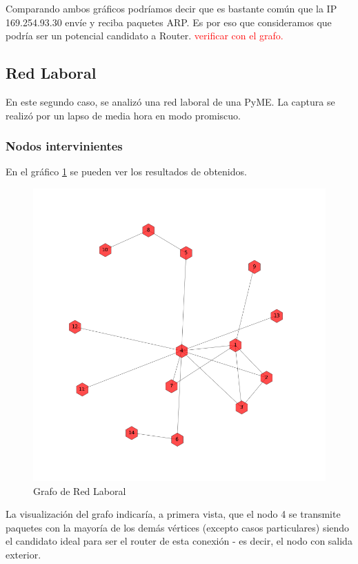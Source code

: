 Comparando ambos gr\'aficos podr\'iamos decir que es bastante com\'un que la IP 169.254.93.30 env\'ie y reciba paquetes ARP. Es por eso que consideramos que podr\'ia ser un potencial candidato a Router. \textcolor{red}{verificar con el grafo.}

\newpage
\subsection{Red Laboral}

En este segundo caso, se analiz\'o una red laboral de una PyME. La captura se realiz\'o por un lapso de media hora en modo promiscuo.

\subsubsection{Nodos intervinientes}
En el gr\'afico \ref{laboralGraph} se pueden ver los resultados de obtenidos.

\begin{figure}[h!]
    \centering                                                       
    \includegraphics[width=400pt]{img/laboralGraph.png}
    \caption{Grafo de Red Laboral}
    \label{laboralGraph}
\end{figure}

La visualizaci\'on del grafo indicar\'ia, a primera vista, que el nodo 4 se transmite paquetes con la mayor\'ia de los dem\'as v\'ertices (excepto casos particulares) siendo el candidato ideal para ser el router de esta conexi\'on - es decir, el nodo con salida exterior.\\

